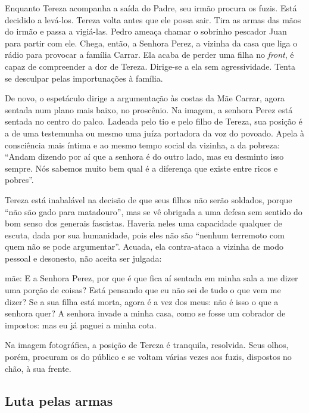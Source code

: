 Enquanto Tereza acompanha a saída do Padre, seu irmão procura os fuzis.
Está decidido a levá-los. Tereza volta antes que ele possa sair. Tira as
armas das mãos do irmão e passa a vigiá-las. Pedro ameaça chamar o
sobrinho pescador Juan para partir com ele. Chega, então, a Senhora
Perez, a vizinha da casa que liga o rádio para provocar a família
Carrar. Ela acaba de perder uma filha no {\it front}, é capaz de
compreender a dor de Tereza. Dirige-se a ela sem agressividade. Tenta se
desculpar pelas importunações à família.

De novo, o espetáculo dirige a argumentação às costas da Mãe Carrar,
agora sentada num plano mais baixo, no proscênio. Na imagem, a senhora
Perez está sentada no centro do palco. Ladeada pelo tio e pelo filho de
Tereza, sua posição é a de uma testemunha ou mesmo uma juíza portadora
da voz do povoado. Apela à consciência mais íntima e ao mesmo tempo
social da vizinha, a da pobreza: “Andam dizendo por aí que a senhora é
do outro lado, mas eu desminto isso sempre. Nós sabemos muito bem qual é
a diferença que existe entre ricos e pobres”.

Tereza está inabalável na decisão de que seus filhos não serão soldados,
porque “não são gado para matadouro”, mas se vê obrigada a uma defesa
sem sentido do bom senso dos generais fascistas. Haveria neles
uma capacidade qualquer de escuta, dada por sua humanidade, pois eles
não são “nenhum terremoto com quem não se pode argumentar”. Acuada, ela
contra-ataca a vizinha de modo pessoal e desonesto, não aceita ser
julgada:

\startblockquote
{\sc mãe}: E a Senhora Perez, por que é que fica aí sentada em
minha sala a me dizer uma porção de coisas? Está pensando que eu não sei
de tudo o que vem me dizer? Se a sua filha está morta, agora é a vez dos
meus: não é isso o que a senhora quer? A senhora invade a minha casa,
como se fosse um cobrador de impostos: mas eu já paguei a minha cota.
\stopblockquote

Na imagem fotográfica, a posição de Tereza é tranquila, resolvida. Seus
olhos, porém, procuram os do público e se voltam várias vezes aos fuzis,
dispostos no chão, à sua frente.


\subsection{Luta pelas armas}

